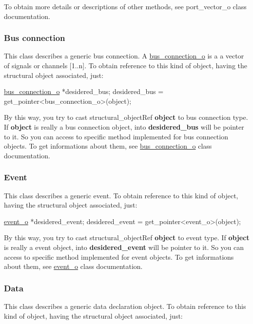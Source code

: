 To obtain more details or descriptions of other methods, see port\+\_\+vector\+\_\+o class documentation.\hypertarget{src_circuit_page_s_o_bus_connection}{}\subsubsection{Bus connection}\label{src_circuit_page_s_o_bus_connection}
This class describes a generic bus connection. A \hyperlink{classbus__connection__o}{bus\+\_\+connection\+\_\+o} is a a vector of signals or channels \mbox{[}1..n\mbox{]}. To obtain reference to this kind of object, having the structural object associated, just\+: 
\begin{DoxyCode}
\hyperlink{classbus__connection__o}{bus\_connection\_o} *desidered\_bus;
desidered\_bus = get\_pointer<bus\_connection\_o>(object);
\end{DoxyCode}
 By this way, you try to cast structural\+\_\+object\+Ref {\bfseries object} to bus connection type. If {\bfseries object} is really a bus connection object, into {\bfseries desidered\+\_\+bus} will be pointer to it. So you can access to specific method implemented for bus connection objects. To get informations about them, see \hyperlink{classbus__connection__o}{bus\+\_\+connection\+\_\+o} class documentation.\hypertarget{src_circuit_page_s_o_event}{}\subsubsection{Event}\label{src_circuit_page_s_o_event}
This class describes a generic event. To obtain reference to this kind of object, having the structural object associated, just\+: 
\begin{DoxyCode}
\hyperlink{classevent__o}{event\_o} *desidered\_event;
desidered\_event = get\_pointer<event\_o>(object);
\end{DoxyCode}
 By this way, you try to cast structural\+\_\+object\+Ref {\bfseries object} to event type. If {\bfseries object} is really a event object, into {\bfseries desidered\+\_\+event} will be pointer to it. So you can access to specific method implemented for event objects. To get informations about them, see \hyperlink{classevent__o}{event\+\_\+o} class documentation.\hypertarget{src_circuit_page_s_o_data}{}\subsubsection{Data}\label{src_circuit_page_s_o_data}
This class describes a generic data declaration object. To obtain reference to this kind of object, having the structural object associated, just\+: 
